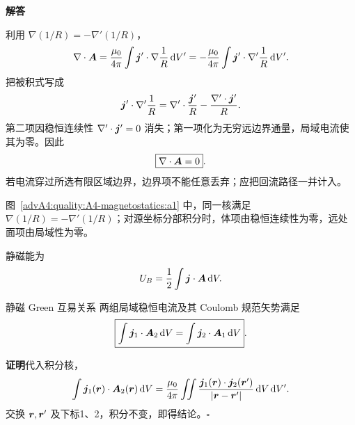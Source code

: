 \begin{advsolution}
\begin{center}\begin{minipage}{.96\linewidth}\centering
\raggedright{\bfseries\color{DeepBlue}解答}\par\smallskip\centering

\label{advA4:quality:A4-magnetostatics:a1}
\end{minipage}\end{center}

利用 $\nabla(1/R)=-\nabla'(1/R)$，
\[
 \nabla\cdot\bm{A}
 =\frac{\mu_0}{4\pi}\int\bm{j}'\cdot\nabla\frac1R\mathop{}\!\mathrm d V'
 =-\frac{\mu_0}{4\pi}\int\bm{j}'\cdot\nabla'\frac1R\mathop{}\!\mathrm d V'.
\]
把被积式写成
\[
 \bm{j}'\cdot\nabla'\frac1R
 =\nabla'\cdot\frac{\bm{j}'}R-\frac{\nabla'\cdot\bm{j}'}R.
\]
第二项因稳恒连续性 $\nabla'\cdot\bm{j}'=0$ 消失；第一项化为无穷远边界通量，局域电流使其为零。因此
\[
 \boxed{\nabla\cdot\bm{A}=0}.
\]
若电流穿过所选有限区域边界，边界项不能任意丢弃；应把回流路径一并计入。

图~\ref{advA4:quality:A4-magnetostatics:a1} 中，同一核满足 $\nabla(1/R)=-\nabla'(1/R)$；对源坐标分部积分时，体项由稳恒连续性为零，远处面项由局域性为零。
\end{advsolution}

静磁能为
\[
 U_B=\frac12\int\bm{j}\cdot\bm{A}\mathop{}\!\mathrm d V.
\]

\begin{advtheorem}{静磁 Green 互易关系}\label{advA4:thm:magnetic-reciprocity}
两组局域稳恒电流及其 Coulomb 规范矢势满足
\[
 \boxed{\int\bm{j}_1\cdot\bm{A}_2\mathop{}\!\mathrm d V
 =\int\bm{j}_2\cdot\bm{A}_1\mathop{}\!\mathrm d V}.
\]
\end{advtheorem}
\noindent\textbf{证明}\quad 代入积分核，
\[
 \int\bm{j}_1(\bm{r})\cdot\bm{A}_2(\bm{r})\mathop{}\!\mathrm d V
 =\frac{\mu_0}{4\pi}\iint
 \frac{\bm{j}_1(\bm{r})\cdot\bm{j}_2(\bm{r}')}
 {|\bm{r}-\bm{r}'|}\mathop{}\!\mathrm d V\mathop{}\!\mathrm d V'.
\]
交换 $\bm{r},\bm{r}'$ 及下标1、2，积分不变，即得结论。\hfill$\square$

